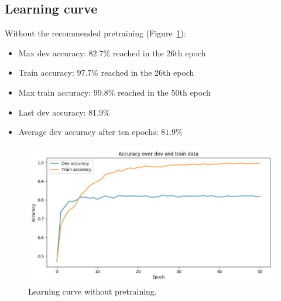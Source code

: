 \subsection{Learning curve}
\begin{minipage}{\linewidth}
	Without the recommended pretraining (Figure~\ref{fig:learning_curve}):
	\begin{itemize}
		\item Max dev accuracy: $82.7\%$ reached in the 26th epoch
		\item Train accuracy: $97.7\%$ reached in the 26th epoch
		\item Max train accuracy: $99.8\%$ reached in the 50th epoch
		\item Last dev accuracy: $81.9\%$
		\item Average dev accuracy after ten epochs: $81.9\%$
	\end{itemize}
\end{minipage}
\begin{figure}[!htb]
	\centering
	\includegraphics[scale=0.5]{figures/learning_curve.jpg}
	\caption{Learning curve without pretraining.}
	\label{fig:learning_curve}
\end{figure}

